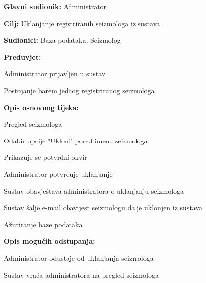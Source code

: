 					\noindent {}
					\begin{packed_item}
	
						\item \textbf{Glavni sudionik:} Administrator
						\item \textbf{Cilj:} Uklanjanje registriranih seizmologa iz sustava
						\item \textbf{Sudionici:} Baza podataka, Seizmolog
						\item \textbf{Preduvjet:} 
							\begin{packed_item}
								\item Administrator prijavljen u sustav
								\item Postojanje barem jednog registriranog seizmologa
							\end{packed_item}
						\item  \textbf{Opis osnovnog tijeka:}
						
						\item[] \begin{packed_enum}
	
							\item Pregled seizmologa
							\item Odabir opcije "Ukloni" pored imena seizmologa
							\item Prikazuje se potvrdni okvir
							\item Administrator potvrđuje uklanjanje
							\item Sustav obavještava administratora o uklanjanju seizmologa
							\item Sustav šalje e-mail obavijest seizmologu da je uklonjen iz sustava
							\item Ažuriranje baze podataka
							
						\end{packed_enum}
					\item \textbf{Opis mogućih odstupanja:}
					\item[] \begin{packed_item}
							\item[3.a] Administrator odustaje od uklanjanja seizmologa
							\item[] \begin{packed_enum}
								\item Sustav vraća administratora na pregled seizmologa
							\end{packed_enum}	
						\end{packed_item}
					\end{packed_item}

